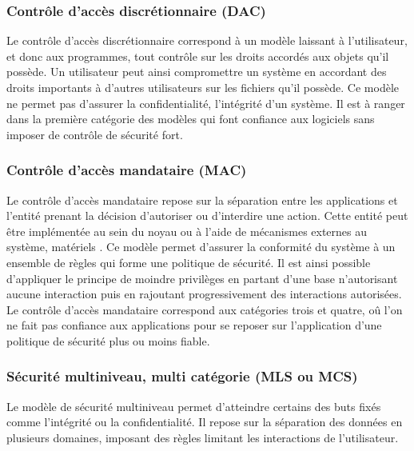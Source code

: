 \subsubsection{Contrôle d'accès discrétionnaire (DAC)}

Le contrôle d'accès discrétionnaire correspond à un modèle laissant à l'utilisateur, et donc aux programmes, tout contrôle sur les droits accordés aux objets qu'il possède. Un utilisateur peut ainsi compromettre un système en accordant des droits importants à d'autres utilisateurs sur les fichiers qu'il possède. Ce modèle ne permet pas d'assurer la confidentialité, l'intégrité d'un système. Il est à ranger dans la première catégorie des modèles qui font confiance aux logiciels sans imposer de contrôle de sécurité fort.

\subsubsection{Contrôle d'accès mandataire (MAC)}

Le contrôle d'accès mandataire repose sur la séparation entre les applications et l'entité prenant la décision d'autoriser ou d'interdire une action. Cette entité peut être implémentée au sein du noyau ou à l'aide de mécanismes externes au système, matériels \cite{ITXT}. Ce modèle permet d'assurer la conformité du système à un ensemble de règles qui forme une politique de sécurité. Il est ainsi possible d'appliquer le principe de moindre privilèges en partant d'une base n'autorisant aucune interaction puis en rajoutant progressivement des interactions autorisées. Le contrôle d'accès mandataire correspond aux catégories trois et quatre, oû l'on ne fait pas confiance aux applications pour se reposer sur l'application d'une politique de sécurité plus ou moins fiable.


\subsubsection{Sécurité multiniveau, multi catégorie (MLS ou MCS)}

Le modèle de sécurité multiniveau permet d'atteindre certains des buts fixés comme l'intégrité ou la confidentialité. Il repose sur la séparation des données en plusieurs domaines, imposant des règles limitant les interactions de l'utilisateur.

